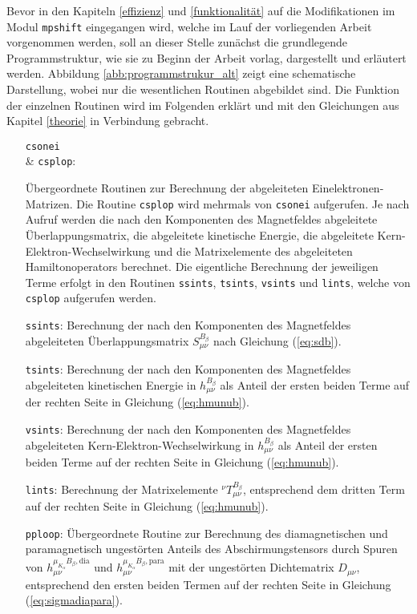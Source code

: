 Bevor in den Kapiteln \ref{effizienz} und \ref{funktionalität} auf die Modifikationen im Modul \texttt{mpshift} eingegangen wird, welche im Lauf der vorliegenden Arbeit vorgenommen werden, soll an dieser Stelle zunächst die grundlegende Programmstruktur, wie sie zu Beginn der Arbeit vorlag, dargestellt und erläutert werden. Abbildung \ref{abb:programmstrukur_alt} zeigt eine schematische Darstellung, wobei nur die wesentlichen Routinen abgebildet sind. Die Funktion der einzelnen Routinen wird im Folgenden erklärt und mit den Gleichungen aus Kapitel \ref{theorie} in Verbindung gebracht. 

\begin{itemize}[leftmargin=60pt]
\item[{\parbox[t]{0.145\linewidth}{\texttt{csonei} \\ \& \texttt{csplop}:}}]\parbox[t]{1\linewidth}{Übergeordnete Routinen zur Berechnung der abgeleiteten Einelektronen-Matrizen. Die Routine \texttt{csplop} wird mehrmals von \texttt{csonei} aufgerufen. Je nach Aufruf werden die nach den Komponenten des Magnetfeldes abgeleitete Überlappungsmatrix, die abgeleitete kinetische Energie, die abgeleitete Kern-Elektron-Wechselwirkung und die Matrixelemente des abgeleiteten Hamiltonoperators berechnet. Die eigentliche Berechnung der jeweiligen Terme erfolgt in den Routinen \texttt{ssints}, \texttt{tsints}, \texttt{vsints} und \texttt{lints}, welche von \texttt{csplop} aufgerufen werden.}
\item[\texttt{ssints}:] Berechnung der nach den Komponenten des Magnetfeldes abgeleiteten Überlappungsmatrix $S_{\mu\nu}^{B_\beta}$ nach Gleichung (\ref{eq:sdb}).
\item[\texttt{tsints}:] Berechnung der nach den Komponenten des Magnetfeldes abgeleiteten kinetischen Energie in $h_{\mu\nu}^{B_\beta}$ als Anteil der ersten beiden Terme auf der rechten Seite in Gleichung (\ref{eq:hmunub}).
\item[\texttt{vsints}:] Berechnung der nach den Komponenten des Magnetfeldes abgeleiteten Kern-Elektron-Wechselwirkung in $h_{\mu\nu}^{B_\beta}$ als Anteil der ersten beiden Terme auf der rechten Seite in Gleichung (\ref{eq:hmunub}).
\item[\texttt{lints}:] Berechnung der Matrixelemente $^{\nu}T_{\mu\nu}^{B_\beta}$, entsprechend dem dritten Term auf der rechten Seite in Gleichung (\ref{eq:hmunub}).
\item[\texttt{pploop}:] Übergeordnete Routine zur Berechnung des diamagnetischen und paramagnetisch ungestörten Anteils des Abschirmungstensors durch Spuren von $h_{\mu\nu}^{\mu_{K_\alpha}B_\beta,\textrm{dia}}$ und $h_{\mu\nu}^{\mu_{K_\alpha}B_\beta,\textrm{para}}$ mit der ungestörten Dichtematrix $D_{\mu\nu}$, entsprechend den ersten beiden Termen auf der rechten Seite in Gleichung (\ref{eq:sigmadiapara}). 

\end{itemize}
